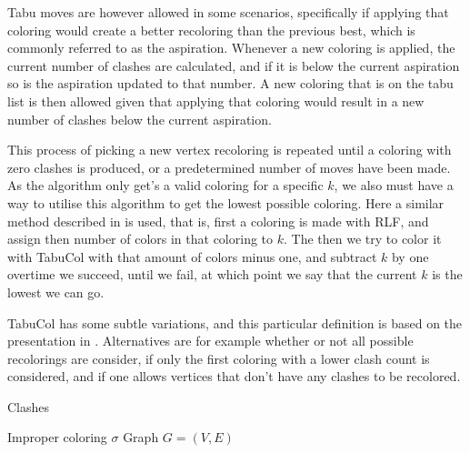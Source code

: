 \documentclass{amsart}
\begin{document}
Tabu moves are however allowed in some scenarios, specifically if applying that
coloring would create a better recoloring than the previous best, which is
commonly referred to as the aspiration. Whenever a new coloring is applied, the
current number of clashes are calculated, and if it is below the current
aspiration so is the aspiration updated to that number.  A new coloring that is
on the tabu list is then allowed given that applying that coloring would result
in a new number of clashes below the current aspiration.

This process of picking a new vertex recoloring is repeated until a coloring
with zero clashes is produced, or a predetermined number of moves have been
made. As the algorithm only get's a valid coloring for a specific $k$, we also
must have a way to utilise this algorithm to get the lowest possible coloring.
Here a similar method described in \cite{Constructive} is used, that is, first a
coloring is made with RLF, and assign then number of colors in that coloring to
$k$.  The then we try to color it with TabuCol with that amount of colors minus
one, and subtract $k$ by one overtime we succeed, until we fail, at which point
we say that the current $k$ is the lowest we can go.

TabuCol has some subtle variations, and this particular definition is based on
the presentation in \cite{Constructive}. Alternatives are for example whether or
not all possible recolorings are consider, if only the first coloring with a
lower clash count is considered, and if one allows vertices that don't have any
clashes to be recolored.

\begin{algorithm}[H]
    \caption{Clashes}
    \begin{algorithmic}[1]
        \REQUIRE Improper coloring $\sigma$
        \REQUIRE Graph $G = (V,E)$
    \end{algorithmic}
\end{algorithm}
\end{document}
